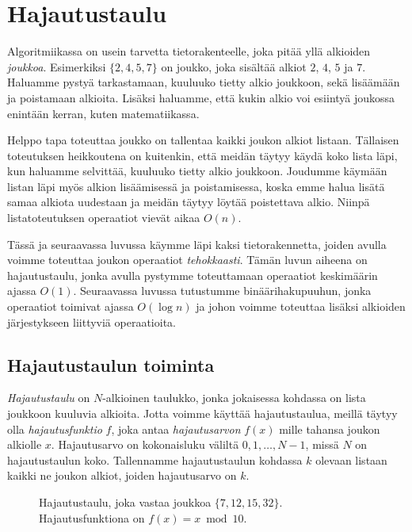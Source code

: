 \chapter{Hajautustaulu}

Algoritmiikassa on usein tarvetta
tietorakenteelle, joka pitää yllä alkioiden \emph{joukkoa}.
Esimerkiksi $\{2,4,5,7\}$ on joukko, joka sisältää
alkiot $2$, $4$, $5$ ja $7$.
Haluamme pystyä tarkastamaan, kuuluuko tietty alkio
joukkoon, sekä lisäämään ja poistamaan alkioita.
Lisäksi haluamme,
että kukin alkio voi esiintyä joukossa enintään kerran,
kuten matematiikassa.

Helppo tapa toteuttaa joukko on tallentaa
kaikki joukon alkiot listaan.
Tällaisen toteutuksen heikkoutena on kuitenkin,
että meidän täytyy käydä koko lista läpi,
kun haluamme selvittää, kuuluuko tietty alkio joukkoon.
Joudumme käymään listan läpi myös alkion lisäämisessä ja
poistamisessa, koska emme halua lisätä samaa alkiota
uudestaan ja meidän täytyy löytää poistettava alkio.
Niinpä listatoteutuksen operaatiot vievät aikaa $O(n)$.

Tässä ja seuraavassa luvussa käymme läpi kaksi
tietorakennetta, joiden avulla voimme toteuttaa
joukon operaatiot \emph{tehokkaasti}.
Tämän luvun aiheena on hajautustaulu,
jonka avulla pystymme toteuttamaan operaatiot
keskimäärin ajassa $O(1)$.
Seuraavassa luvussa tutustumme binäärihaku\-puuhun,
jonka operaatiot toimivat ajassa $O(\log n)$
ja johon voimme toteuttaa lisäksi alkioiden järjestykseen
liittyviä operaatioita.

\section{Hajautustaulun toiminta}

\emph{Hajautustaulu} on $N$-alkioinen taulukko,
jonka jokaisessa kohdassa on lista joukkoon kuuluvia alkioita.
Jotta voimme käyttää hajautustaulua,
meillä täytyy olla \emph{hajautusfunktio} $f$,
joka antaa \emph{hajautusarvon}
$f(x)$ mille tahansa joukon alkiolle $x$.
Hajautusarvo on kokonaisluku väliltä
$0,1,\dots,N-1$, missä $N$ on hajautustaulun koko.
Tallennamme hajautustaulun kohdassa $k$ olevaan listaan
kaikki ne joukon alkiot, joiden hajautusarvo on $k$.

\begin{figure}
\caption{Hajautustaulu, joka vastaa joukkoa $\{7,12,15,32\}$.
Hajautusfunktiona on $f(x)=x \bmod 10$.}
\label{fig:hajtau}
\end{figure}

